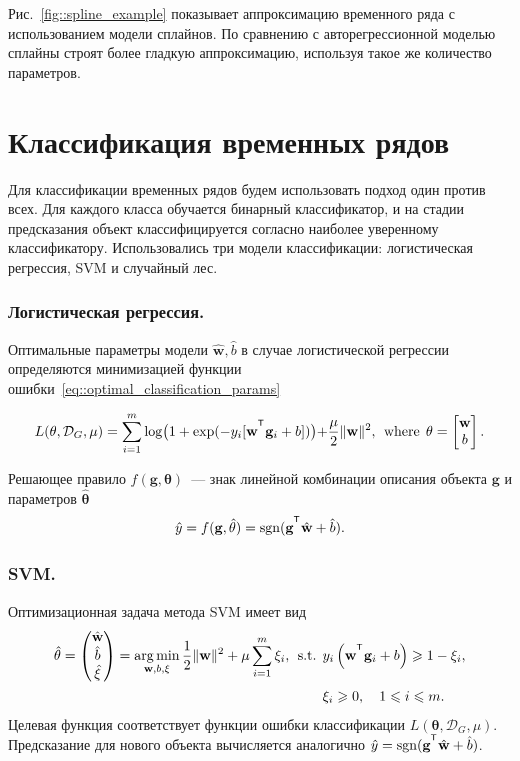 Рис.~\ref{fig::spline_example} показывает аппроксимацию временного ряда с использованием модели сплайнов.
По сравнению с авторегрессионной моделью сплайны строят более гладкую аппроксимацию, используя такое же количество параметров.

\section{Классификация временных рядов}
Для классификации временных рядов будем использовать подход один против всех. 
Для каждого класса обучается бинарный классификатор, и на стадии предсказания объект классифицируется согласно наиболее уверенному классификатору.
Использовались три модели классификации: логистическая регрессия, SVM и случайный лес.

\subsubsection{Логистическая регрессия.}
Оптимальные параметры модели $\hat{\mathbf{w}}, \hat{b}$  в случае логистической регрессии определяются минимизацией функции ошибки~\eqref{eq::optimal_classification_params}

\begin{equation*}
L(\mathbf{\theta}, \mathcal{D}_G, \mu) = \sum_{i=1}^{m} \log\bigl(1 + \exp(-y_i [\mathbf{w}^{\T} \mathbf{g}_i + b])\bigl) + \frac{\mu}{2} \|\mathbf{w}\|^2, \:\:\mbox{where}\:\: \mathbf{\theta}  = \begin{bmatrix}
\mathbf{w} \\ b
\end{bmatrix}.
\end{equation*}

Решающее правило $f(\mathbf{g}, \mathbf{\theta})$~--- знак линейной комбинации описания объекта $\mathbf{g}$ и параметров $\hat{\mathbf{\theta}}$
\begin{equation*}
\hat{y} = f(\mathbf{g}, \hat{\mathbf{\theta}}) = \sgn(\mathbf{g}^{\T} \hat{\mathbf{w}} + \hat{b}).
\end{equation*}

\subsubsection{SVM.}
Оптимизационная задача метода SVM имеет вид
\begin{align*}
\hat{\mathbf{\theta}}  = \begin{pmatrix}
\hat{\mathbf{w}} \\ \hat{b} \\ \hat{\mathbf{\xi}}
\end{pmatrix}= \argmin_{\mathbf{w}, b, \mathbf{\xi}}  \frac{1}{2} \|\mathbf{w}\|^2 + \mu \sum_{i=1}^{m} \xi_i,\:\:
\mbox{s.t.} \:\: &y_i \left(\mathbf{w}^{\T} \mathbf{g}_i + b\right) \geq 1 - \xi_i,\\
&\xi_i \geq 0, \quad 1 \leq i \leq m.
\end{align*}
Целевая функция соответствует функции ошибки классификации $L(\mathbf{\theta}, \mathcal{D}_G, \mu)$.
Предсказание для нового объекта вычисляется аналогично $
\hat{y} = \sgn (\mathbf{g}^{\T} \hat{\mathbf{w}} + \hat{b})$.

